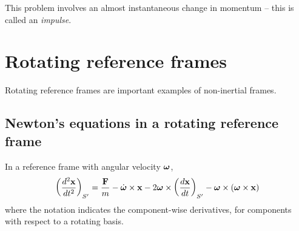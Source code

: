\documentclass{../template/note}
\begin{document}
    \begin{remark*}
        This problem involves an almost instantaneous change in momentum -- this is called an \emph{impulse}.
    \end{remark*}
    
    \section{Rotating reference frames}

    Rotating reference frames are important examples of non-inertial frames.

    \subsection{Newton's equations in a rotating reference frame}

    \begin{theorem}
        In a reference frame with angular velocity \(\V \omega\),
        \begin{align*}
            \left(\frac{d^2\V x}{dt^2}\right)_{S'} = \frac{\V F}m - \dot{\V \omega} \times \V x - 2 \V \omega \times \left(\frac{d\V x}{dt}\right)_{S'} - \V \omega \times (\V \omega \times \V x)
        \end{align*}
        where the notation indicates the component-wise derivatives, for components with respect to a rotating basis.
    \end{theorem}
\end{document}
